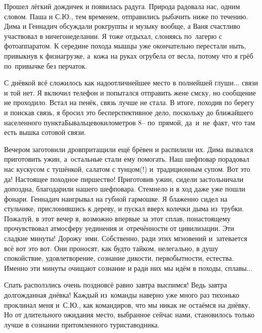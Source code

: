 Прошел лёгкий дождичек и появилась радуга. Природа радовала нас, одним словом. Паша и С.Ю., тем временем, отправились рыбачить ниже по течению. Дима и Геннадич обсуждали рок\sdash группы и музыку вообще, а Ваня счастливо участвовал в ничегонеделании. Я тоже отдыхал, слоняясь по~лагерю с фотоаппаратом. К середине похода мышцы уже окончательно перестали ныть, привыкнув к физнагрузке, а~кожа на руках огрубела от весла, потому что я грёб по~привычке без перчаток. 

С днёвкой всё сложилось как надо\mdash отличнейшее место в полнейшей глуши$\ldots$ связи и той нет. Я включил телефон и попытался отправить жене смску, но сообщение не проходило. Встал на пенёк, связь лучше не стала. В итоге, походив по берегу и поискав связь, я бросил это бесперспективное дело, поскольку до ближайшего населенного пункта\mdash Бывальцево\mdash километров 8\thinspace\nobreakdash-- по~прямой, да~и~не~факт, что там есть вышка сотовой связи.

Вечером заготовили дров\mdash притащили ещё брёвен и распилили их. Дима вызвался приготовить ужин, а~остальные стали ему помогать. Наш шеф\sdash повар порадовал нас кус\sdash кусом с тушёнкой, салатом с тунцом(!) и~традиционным супом. Вот это да! Настоящее походное пиршество! Приготовив ужин, сидели застольничали допоздна, благодарили нашего шеф\sdash повара. Стемнело и в ход даже уже пошли фонари. Геннадич наигрывал на губной гармошке. Я блаженно сидел на стульчике, прислонившись к дереву, и пускал вверх колечки дыма из~трубки. Пожалуй, в этот вечер я, возможно впервые за этот сплав, по\sdash настоящему прочувствовал атмосферу уединения и~отречённости от цивилизации. Эти сладкие минуты! Дорожу~ими. Собственно, ради этих мгновений и~затевается всё вот это вот. Они проносят, как будто тайком, нелегально, в душу спокойствие, удовлетворение, сознание дикости, первобытности, естества. Именно эти минуты очищают сознание и ради них мы идём в походы, сплавы$\ldots$ 

Спать расползлись очень поздно\mdash всё равно завтра выспимся! Ведь завтра долгожданная днёвка! Каждый из~команды наверно уже много раз тихонько проклинал меня и~С.Ю., как командиров, что мы никак не остаёмся на днёвку. Но от длительного ожидания место, выбранное сейчас нами, становилось только лучше в сознании притомленного туриста\sdash водника.

\begin{center}
\end{center}
